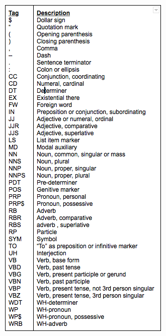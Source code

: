 \documentclass[11pt,a4paper]{article}
\newenvironment{Figure}
  {\par\medskip\noindent\minipage{\linewidth}}
  {\endminipage\par\medskip}
\begin{document}
\begin{multicols}{2}
\begin{Figure}  
   \centering
   \includegraphics[width=\linewidth]{POStags}
\end{Figure}   


\end{multicols}
\end{document}
